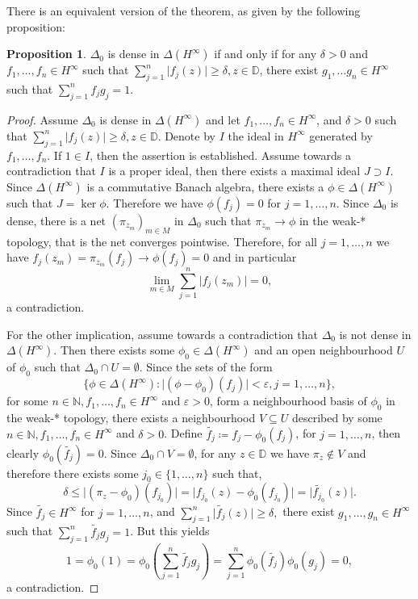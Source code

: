 \documentclass[letterpaper, 11pt]{article}
\newcommand{\D}{\mathbb{D}}
\newcommand{\N}{\mathbb{N}}
\newcommand{\1}{\mathds{1}}
\theoremstyle{definition}
\newtheorem{proposition}[theorem]{Proposition}
\begin{document}
There is an equivalent version of the theorem, as given by the following proposition:

\begin{proposition} \label{prop:corona-equiv}
  $\Delta_0$ is dense in $\Delta(H^\infty)$ if and only if for any $\delta > 0$ and $f_1, \dots, f_n \in H^\infty$ such that $\sum_{j=1}^n \vert f_j(z) \vert \geq \delta, z \in \D$, there exist $g_1, \dots g_n \in H^\infty$ such that $\sum_{j=1}^n f_j g_j = 1$.
\end{proposition}

\begin{proof}
  Assume $\Delta_0$ is dense in $\Delta(H^\infty)$ and let $f_1, \dots, f_n \in H^\infty$, and $\delta > 0$ such that $\sum_{j=1}^n \vert f_j(z) \vert \geq \delta, z \in \D$. Denote by $I$ the ideal in $H^\infty$ generated by $f_1, \dots, f_n$. If $1 \in I$, then the assertion is established. Assume towards a contradiction that $I$ is a proper ideal, then there exists a maximal ideal $J \supset I$. Since $\Delta(H^\infty)$ is a commutative Banach algebra, there exists a $\phi \in \Delta(H^\infty)$ such that $J = \ker \phi$. Therefore we have $\phi(f_j) = 0$ for $j=1,\dots,n$. Since $\Delta_0$ is dense, there is a net $(\pi_{z_m})_{m \in M}$ in $\Delta_0$ such that $\pi_{z_m} \to \phi$ in the weak\nobreakdash-* topology, that is the net converges pointwise. Therefore, for all $j=1,\dots,n$ we have $f_j(z_m) = \pi_{z_m}(f_j) \to \phi(f_j) = 0$ and in particular
  $$ \lim_{m \in M} \sum_{j=1}^n \vert f_j(z_m) \vert = 0, $$
  a contradiction.

  For the other implication, assume towards a contradiction that $\Delta_0$ is not dense in $\Delta(H^\infty)$. Then there exists some $\phi_0 \in \Delta(H^\infty)$ and an open neighbourhood $U$ of $\phi_0$ such that $\Delta_0 \cap U = \emptyset$. Since the sets of the form
  $$ \{ \phi \in \Delta(H^\infty) : \vert (\phi - \phi_0)(f_j) \vert < \varepsilon, j = 1, \dots, n \}, $$
  for some $n \in \N, f_1, \dots, f_n \in H^\infty$ and $\varepsilon > 0$, form a neighbourhood basis of $\phi_0$ in the weak\nobreakdash-* topology, there exists a neighbourhood $V \subseteq U$ described by some $n \in \N, f_1, \dots, f_n \in H^\infty$ and $\delta > 0$. Define $\widetilde{f_j} \coloneqq f_j - \phi_0(f_j)$, for $j=1,\dots,n$, then clearly $\phi_0(\widetilde{f_j}) = 0$. Since $\Delta_0 \cap V = \emptyset$, for any $z \in \D$ we have $\pi_z \notin V$ and therefore there exists some $j_0 \in \{ 1, \dots, n \}$ such that,
  $$ \delta \leq \vert (\pi_z - \phi_0)(f_{j_0}) \vert = \vert f_{j_0}(z) - \phi_0(f_{j_0}) \vert = \vert \widetilde{f_{j_0}}(z) \vert. $$
  Since $\widetilde{f_j} \in H^\infty$ for $j=1,\dots,n$, and $ \sum_{j=1}^n \vert \widetilde{f_j}(z) \vert \geq \delta, $ there exist $g_1, \dots, g_n \in H^\infty$ such that $\sum_{j=1}^n \widetilde{f_j} g_j = 1$. But this yields
  $$ 1 = \phi_0(1) = \phi_0 \left( \sum_{j=1}^n \widetilde{f_j} g_j \right) = \sum_{j=1}^n \phi_0(\widetilde{f_j}) \phi_0(g_j) = 0, $$
  a contradiction.
\end{proof}
\end{document}
